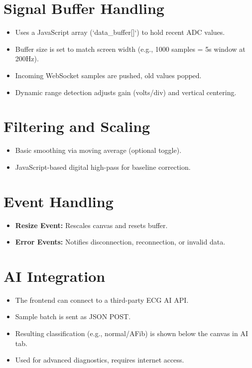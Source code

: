 \section{Signal Buffer Handling}
\begin{itemize}
    \item Uses a JavaScript array (`data\_buffer[]`) to hold recent ADC values.
    \item Buffer size is set to match screen width (e.g., 1000 samples = 5s window at 200Hz).
    \item Incoming WebSocket samples are pushed, old values popped.
    \item Dynamic range detection adjusts gain (volts/div) and vertical centering.
\end{itemize}

\section{Filtering and Scaling}
\begin{itemize}
    \item Basic smoothing via moving average (optional toggle).
    \item JavaScript-based digital high-pass for baseline correction.
\end{itemize}

\section{Event Handling}
\begin{itemize}
    \item \textbf{Resize Event:} Rescales canvas and resets buffer.
    \item \textbf{Error Events:} Notifies disconnection, reconnection, or invalid data.
\end{itemize}

\section{AI Integration}
\begin{itemize}
    \item The frontend can connect to a third-party ECG AI API.
    \item Sample batch is sent as JSON POST.
    \item Resulting classification (e.g., normal/AFib) is shown below the canvas in AI tab.
    \item Used for advanced diagnostics, requires internet access.
\end{itemize}






